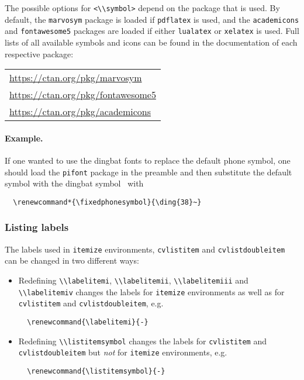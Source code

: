 \documentclass[a4paper, 11pt]{article}
\newcommand{\code}[1]{\lstinline!#1!}
\begin{document}
The possible options for \code{<\\symbol>} depend on the package that is used.
By default, the \code{marvosym} package is loaded if \code{pdflatex} is used, and the \code{academicons} and \code{fontawesome5} packages are loaded if either \code{lualatex} or \code{xelatex} is used.
Full lists of all available symbols and icons can be found in the documentation of each respective package:

\begin{tabular}{l}
  \url{https://ctan.org/pkg/marvosym} \\[1ex]
  \url{https://ctan.org/pkg/fontawesome5} \\[1ex]
  \url{https://ctan.org/pkg/academicons}
\end{tabular}

\paragraph{Example.}
If one wanted to use the dingbat fonts to replace the default phone symbol, one should load the \code{pifont} package in the preamble and then substitute the default symbol with the dingbat symbol \ with
\begin{lstlisting}
  \renewcommand*{\fixedphonesymbol}{\ding{38}~}
\end{lstlisting}

\subsubsection{Listing labels}
The labels used in \code{itemize} environments, \code{cvlistitem} and \code{cvlistdoubleitem} can be changed in two different ways:

\begin{itemize}
  \item Redefining \code{\\labelitemi}, \code{\\labelitemii}, \code{\\labelitemiii} and \code{\\labelitemiv} changes the labels for \code{itemize} environments as well as for \code{cvlistitem} and \code{cvlistdoubleitem}, e.g.
  \begin{lstlisting}
  \renewcommand{\labelitemi}{-}
  \end{lstlisting}
  \item Redefining \code{\\listitemsymbol} changes the labels for \code{cvlistitem} and \code{cvlistdoubleitem} but \emph{not} for \code{itemize} environments, e.g.
  \begin{lstlisting}
  \renewcommand{\listitemsymbol}{-}
\end{lstlisting}
\end{itemize}
\end{document}
